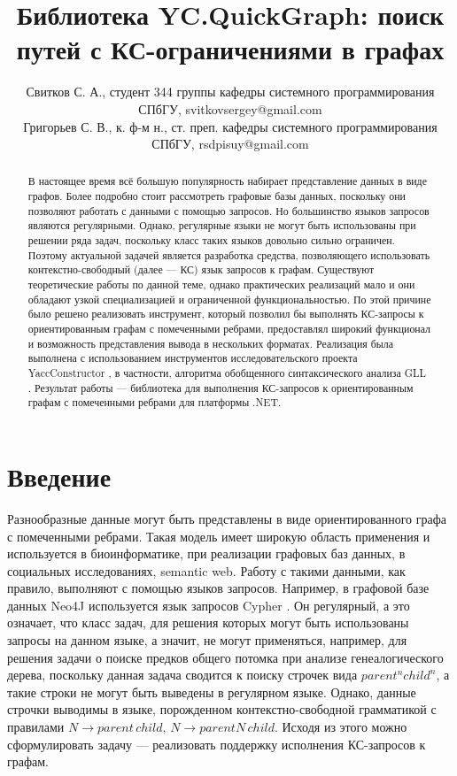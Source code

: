 \documentclass{spisok-article}
\title{Библиотека YC.QuickGraph: поиск путей с КС-ограничениями в графах}
\author{
    Свитков С. А., 
    студент 344 группы кафедры системного программирования СПбГУ,
    svitkovsergey@gmail.com
    
    Григорьев С. В.,
    к. ф-м н., ст. преп. кафедры системного программирования СПбГУ,
    rsdpisuy@gmail.com
}
\begin{document}
\maketitle

\begin{abstract}
	В настоящее время всё большую популярность набирает представление данных в виде графов. Более подробно стоит рассмотреть графовые базы данных, поскольку они позволяют работать с данными с помощью запросов. Но большинство языков запросов являются регулярными. Однако, регулярные языки не могут быть использованы при решении ряда задач, поскольку класс таких языков довольно сильно ограничен. Поэтому актуальной задачей является разработка средства, позволяющего использовать контекстно-свободный (далее --- КС) язык запросов к графам. Существуют теоретические работы по данной теме, однако практических реализаций мало и они обладают узкой специализацией и ограниченной функциональностью. По этой причине было решено реализовать инструмент, который позволил бы выполнять КС-запросы к ориентированным графам с помеченными ребрами, предоставлял широкий функционал и возможность представления вывода в нескольких форматах. Реализация была выполнена с использованием инструментов исследовательского проекта YaccConstructor \cite{YC}, в частности, алгоритма обобщенного синтаксического анализа GLL \cite{gll}. Результат работы --- библиотека для выполнения КС-запросов к ориентированным графам с помеченными ребрами для платформы .NET.
\end{abstract}

\section{Введение}
    Разнообразные данные могут быть представлены в виде ориентированного графа с помеченными ребрами. Такая модель имеет широкую область применения и используется в биоинформатике, при реализации графовых баз данных, в социальных исследованиях, semantic web. Работу с такими данными, как правило, выполняют с помощью языков запросов. Например, в графовой базе данных Neo4J \cite{neo4j} используется язык запросов Cypher \cite{cypher}. Он регулярный, а это означает, что класс задач, для решения которых могут быть использованы запросы на данном языке, а значит, не могут применяться, например, для решения задачи о поиске предков общего потомка при анализе генеалогического дерева, поскольку данная задача сводится к поиску строчек вида \(parent^nchild^n\), а такие строки не могут быть выведены в регулярном языке. Однако, данные строчки выводимы в языке, порожденном контекстно-свободной грамматикой с правилами \(N \to parent\,child, \,N \to parentN\, child\). Исходя из этого можно сформулировать задачу --- реализовать поддержку исполнения КС-запросов к графам. 
    
\end{document}
